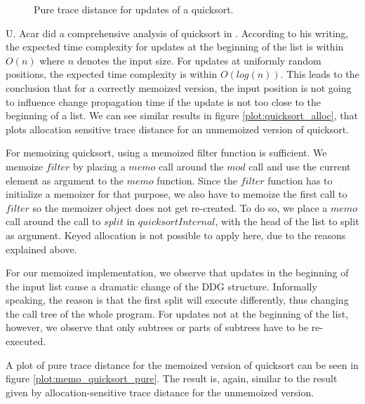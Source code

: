 \begin{figure}
\centering
{}
\caption{Pure trace distance for updates of a quicksort.}
\label{plot:quicksort_pure}
\end{figure}

U. Acar did a comprehensive analysis of quicksort in \cite{Acar2005thesis}. According to his writing, the expected time complexity for updates at the beginning of the list is within $O(n)$ where $n$ denotes the input size. For updates at uniformly random positions, the expected time complexity is within $O(log(n))$. This leads to the conclusion that for a correctly memoized version, the input position is not going to influence change propagation time if the update is not too close to the beginning of a list. We can see similar results in figure \ref{plot:quicksort_alloc}, that plots allocation sensitive trace distance for an unmemoized version of quicksort. 

For memoizing quicksort, using a memoized filter function is sufficient. We memoize $filter$ by placing a $memo$ call around the $mod$ call and use the current element as argument to the $memo$ function. Since the $filter$ function has to initialize a memoizer for that purpose, we also have to memoize the first call to $filter$ so the memoizer object does not get re-created. To do so, we place a $memo$ call around the call to $split$ in $quicksortInternal$, with the head of the list to split as argument. Keyed allocation is not possible to apply here, due to the reasons explained above. 

For our memoized implementation, we observe that updates in the beginning of the input list cause a dramatic change of the DDG structure. Informally speaking, the reason is that the first split will execute differently, thus changing the call tree of the whole program. For updates not at the beginning of the list, however, we observe that only subtrees or parts of subtrees have to be re-executed. 

A plot of pure trace distance for the memoized version of quicksort can be seen in figure \ref{plot:memo_quicksort_pure}. The result is, again, similar to the result given by allocation-sensitive trace distance for the unmemoized version. 

